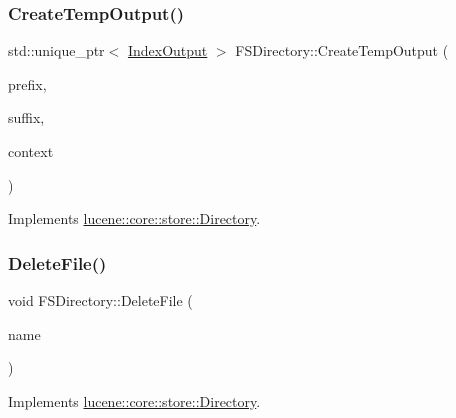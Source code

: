 \subsubsection{\texorpdfstring{Create\+Temp\+Output()}{CreateTempOutput()}}
{\footnotesize\ttfamily std\+::unique\+\_\+ptr$<$ \mbox{\hyperlink{classlucene_1_1core_1_1store_1_1IndexOutput}{Index\+Output}} $>$ F\+S\+Directory\+::\+Create\+Temp\+Output (\begin{DoxyParamCaption}\item[{\mbox{\hyperlink{ZlibCrc32_8h_a2c212835823e3c54a8ab6d95c652660e}{const}} std\+::string \&}]{prefix,  }\item[{\mbox{\hyperlink{ZlibCrc32_8h_a2c212835823e3c54a8ab6d95c652660e}{const}} std\+::string \&}]{suffix,  }\item[{\mbox{\hyperlink{ZlibCrc32_8h_a2c212835823e3c54a8ab6d95c652660e}{const}} \mbox{\hyperlink{classlucene_1_1core_1_1store_1_1IOContext}{I\+O\+Context}} \&}]{context }\end{DoxyParamCaption})\hspace{0.3cm}{\ttfamily [virtual]}}



Implements \mbox{\hyperlink{classlucene_1_1core_1_1store_1_1Directory_a1854df49ef06b705ae603f9430584106}{lucene\+::core\+::store\+::\+Directory}}.

\mbox{\label{classlucene_1_1core_1_1store_1_1FSDirectory_a73d5bc12c68a2d5367d63c3256657a6a}} 
\subsubsection{\texorpdfstring{Delete\+File()}{DeleteFile()}}
{\footnotesize\ttfamily void F\+S\+Directory\+::\+Delete\+File (\begin{DoxyParamCaption}\item[{\mbox{\hyperlink{ZlibCrc32_8h_a2c212835823e3c54a8ab6d95c652660e}{const}} std\+::string \&}]{name }\end{DoxyParamCaption})\hspace{0.3cm}{\ttfamily [virtual]}}



Implements \mbox{\hyperlink{classlucene_1_1core_1_1store_1_1Directory_ae7e4ec460d8646abb925fa9d31a6f354}{lucene\+::core\+::store\+::\+Directory}}.


